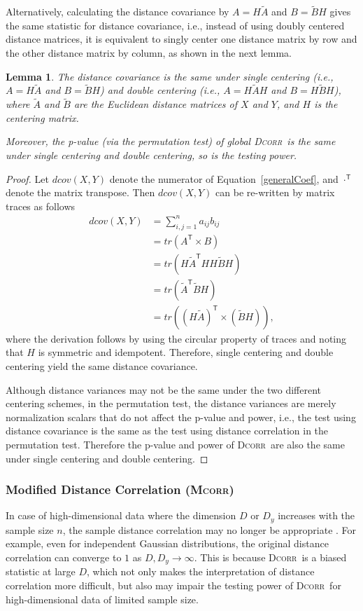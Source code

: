 \documentclass[11pt]{article}
\providecommand{\sct}[1]{{\normalfont\textsc{#1}}}
\newcommand{\T}{^{\ensuremath{\mathsf{T}}}}           %
\newcommand{\Dcorr}{\sct{Dcorr}}
\newcommand{\Mcorr}{\sct{Mcorr}}
\newtheorem{lem}{Lemma}
\begin{document}
Alternatively, calculating the distance covariance by $A=H\tilde{A}$ and $B=\tilde{B}H$ gives the same statistic for distance covariance, i.e., instead of using doubly centered distance matrices, it is equivalent to singly center one distance matrix by row and the other distance matrix by column, as shown in the next lemma.

\begin{lem}
\label{lem1}
The distance covariance is the same under single centering (i.e., $A=H\tilde{A}$ and $B=\tilde{B}H$) and double centering (i.e., $A=H\tilde{A}H$ and $B=H\tilde{B}H$), where $\tilde{A}$ and $\tilde{B}$ are the Euclidean distance matrices of $X$ and $Y$, and $H$ is the centering matrix. 

Moreover, the p-value (via the permutation test) of global \Dcorr~is the same under single centering and double centering, so is the testing power.
\end{lem}
\begin{proof}
Let $dcov(X,Y)$ denote the numerator of Equation~\ref{generalCoef}, and $\cdot\T$ denote the matrix transpose. Then $dcov(X,Y)$ can be re-written by matrix traces as follows
\begin{align*}
dcov(X,Y) &= \sum_{i,j=1}^{n}a_{ij}b_{ij} \\
 &= tr(A\T \times B) \\
 &= tr(H\tilde{A}\T HH\tilde{B}H) \\
 &= tr(\tilde{A}\T \tilde{B}H) \\
 &= tr((H\tilde{A})\T \times (\tilde{B}H)),
\end{align*}
where the derivation follows by using the circular property of traces and noting that $H$ is symmetric and idempotent. Therefore, single centering and double centering yield the same distance covariance.

Although distance variances may not be the same under the two different centering schemes, in the permutation test, the distance variances are merely normalization scalars that do not affect the p-value and power, i.e., the test using distance covariance is the same as the test using distance correlation in the permutation test. Therefore the p-value and power of \Dcorr~are also the same under single centering and double centering.
\end{proof}

\subsubsection{Modified Distance Correlation (\Mcorr)}
\label{appen:mcorr}
In case of high-dimensional data where the dimension $D$ or $D_y$ increases with the sample size $n$, the sample distance correlation may no longer be appropriate \cite{SzekelyRizzo2013a}. For example, even for independent Gaussian distributions, the original distance correlation can converge to $1$ as $D, D_y \rightarrow \infty$. This is because \Dcorr~is a biased statistic at large $D$, which not only makes the interpretation of distance correlation more difficult, but also may impair the testing power of \Dcorr~for high-dimensional data of limited sample size.
\end{document}

